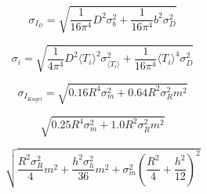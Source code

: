 \documentclass{article}
\begin{document}
\[
  \sigma_{I_{D}} = \sqrt{\frac{1}{16\pi^{4}} D^{2} \sigma_{b}^{2} + \frac{1}{16\pi^{4}} b^{2} \sigma_{D}^{2}}
\]

\[
	\sigma_{i} = \sqrt{\frac{1}{4\pi^{4}} D^{2} \langle T_{i}\rangle^{2} \sigma_{\langle T_{i}\rangle}^{2} + \frac{1}{16\pi^{4}} \langle T_{i}\rangle^{4} \sigma_{D}^{2}}
\]


\[
 \sigma_{I_{Kugel}} =\sqrt{0.16 R^{4} \sigma_{m}^{2} + 0.64 R^{2} \sigma_{R}^{2} m^{2}} 
\]

\[
\sqrt{0.25 R^{4} \sigma_{m}^{2} + 1.0 R^{2} \sigma_{R}^{2} m^{2}}
\]

\[
\sqrt{\frac{R^{2} \sigma_{R}^{2}}{4} m^{2} + \frac{h^{2} \sigma_{h}^{2}}{36} m^{2} + \sigma_{m}^{2} \left(\frac{R^{2}}{4} + \frac{h^{2}}{12}\right)^{2}}
\]
\end{document}
